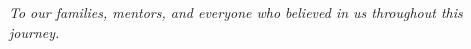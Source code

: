 
\vspace*{\fill}
\begin{center}
\textit{To our families, mentors, and everyone who believed in us throughout this journey.}
\end{center}
\vspace*{\fill}
